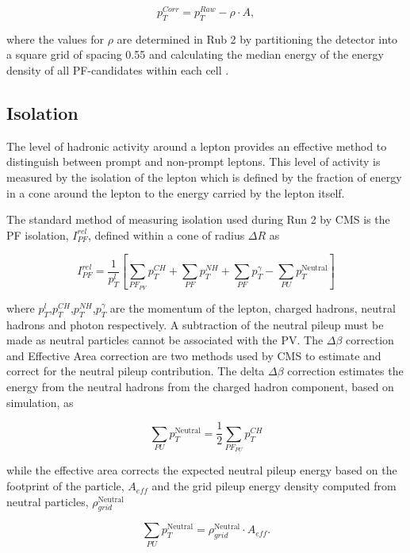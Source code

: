 \begin{equation}
p_T^{Corr} = p_T^{Raw} - \rho \cdot A,
\end{equation}

where the values for $\rho$ are determined in Rub 2 by partitioning the detector into a square grid of spacing
0.55 and calculating the median energy of the energy density of all PF-candidates within each cell \cite{fastjet}.

\subsection{Isolation}

The level of hadronic activity around a lepton provides an effective method to distinguish between prompt and non-prompt leptons.
This level of activity is measured by the isolation of the lepton which is defined by the fraction of energy
in a cone around the lepton to the energy carried by the lepton itself.

The standard method of measuring isolation used during Run 2 by CMS is the PF isolation, $I_{PF}^{rel}$,
defined within a cone of radius $\Delta R$ as 

\begin{equation}
I_{PF}^{rel} = \frac{1}{p_T^{l}}\left[ \sum_{PF_{PV}}p_T^{CH} +  \sum_{PF}p_T^{NH} +  \sum_{PF}p_T^{\gamma} -  \sum_{PU}p_T^{\text{Neutral}}\right]
\end{equation}

where $p_T^{l}$,$p_T^{CH}$,$p_T^{NH}$,$p_T^{\gamma}$ are the momentum of the lepton, charged hadrons, neutral hadrons and photon respectively.
A subtraction of the neutral pileup must be made as neutral particles cannot be associated with the PV. The $\Delta \beta$ correction
and Effective Area correction are two methods used by CMS to estimate and correct for the neutral pileup contribution. The delta $\Delta \beta$
correction estimates the energy from the neutral hadrons from the charged hadron component, based on simulation, as

\begin{equation}
\sum_{PU}p_T^{\text{Neutral}} = \frac{1}{2} \sum_{PF_{PU}}p_T^{CH}
\end{equation}

while the effective area corrects the expected neutral pileup energy based on the footprint of the particle, $A_{eff}$ and the grid pileup
energy density computed from neutral particles, $\rho_{grid}^{\text{Neutral}}$

\begin{equation}
\sum_{PU}p_T^{\text{Neutral}} = \rho_{grid}^{\text{Neutral}}\cdot A_{eff}.
\end{equation}

